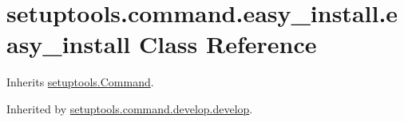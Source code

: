 \hypertarget{classsetuptools_1_1command_1_1easy__install_1_1easy__install}{}\section{setuptools.\+command.\+easy\+\_\+install.\+easy\+\_\+install Class Reference}
\label{classsetuptools_1_1command_1_1easy__install_1_1easy__install}


Inherits \hyperlink{classsetuptools_1_1_command}{setuptools.\+Command}.



Inherited by \hyperlink{classsetuptools_1_1command_1_1develop_1_1develop}{setuptools.\+command.\+develop.\+develop}.

